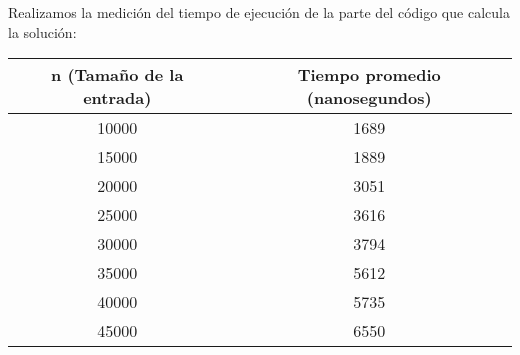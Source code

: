 Realizamos la medición del tiempo de ejecución de la parte del código que calcula la solución:
\begin{table}[h!]
\centering

\label{my-label}
\begin{tabular}{cc}
\hline
\multicolumn{1}{|c|}{n (Tamaño de la entrada)} & \multicolumn{1}{c|}{Tiempo promedio (nanosegundos)}                                                                                                                                    \\ \hline
\multicolumn{1}{|c|}{10000}                        & \multicolumn{1}{c|}{1689}                                                                                                                                     \\ \hline
\multicolumn{1}{|c|}{15000}                        & \multicolumn{1}{c|}{1889}                                                                                                                                     \\ \hline
\multicolumn{1}{|c|}{20000}                        & \multicolumn{1}{c|}{3051}                                                                                                                                     \\ \hline
\multicolumn{1}{|c|}{25000}                        & \multicolumn{1}{c|}{3616}                                                                                                                                     \\ \hline
\multicolumn{1}{|c|}{30000}                        & \multicolumn{1}{c|}{3794}                                                                                                                                     \\ \hline
\multicolumn{1}{|c|}{35000}                        & \multicolumn{1}{c|}{5612}                                                                                                                                     \\ \hline
\multicolumn{1}{|c|}{40000}                        & \multicolumn{1}{c|}{5735}                                                                                                                                     \\ \hline
\multicolumn{1}{|c|}{45000}                        & \multicolumn{1}{c|}{6550}                                                                                                                                     \\ \hline

\end{tabular}
\end{table}
